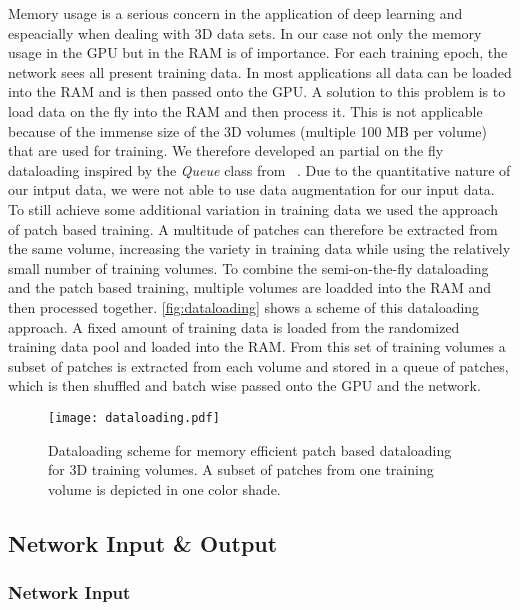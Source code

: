 Memory usage is a serious concern in the application of deep learning and espeacially when dealing with 3D data sets. 
In our case not only the memory usage in the \ac{GPU} but in the \ac{RAM} is of importance. For each training epoch, the network sees all present training data. 
In most applications all data can be loaded into the \acs{RAM} and is then passed onto the \acs{GPU}.
A solution to this problem is to load data on the fly into the RAM and then process it.
This is not applicable because of the immense size of the 3D volumes (multiple 100 MB per volume) that are used for training. 
We therefore developed an partial on the fly dataloading inspired by the \emph{Queue} class from \citeauthor{perez-garcia_torchio_2021}~\cite{perez-garcia_torchio_2021}. 
Due to the quantitative nature of our intput data, we were not able to use data augmentation for our input data. 
To still achieve some additional variation in training data we used the approach of patch based training. 
A multitude of patches can therefore be extracted from the same volume, increasing the variety in training data while using the relatively small number of training volumes. 
To combine the semi-on-the-fly dataloading and the patch based training, multiple volumes are loadded into the RAM and then processed together. 
\autoref{fig:dataloading} shows a scheme of this dataloading approach. 
A fixed amount of training data is loaded from the randomized training data pool and loaded into the RAM. 
From this set of training volumes a subset of patches is extracted from each volume and stored in a queue of patches, which is then shuffled and batch wise passed onto the GPU and the network. 

\begin{figure}
    \centering
    \texttt{[image: dataloading.pdf]}
    \caption{Dataloading scheme for memory efficient patch based dataloading for 3D training volumes. A subset of patches from one training volume is depicted in one color shade.}\label{fig:dataloading}
\end{figure}

\subsection{Network Input \& Output}

\subsubsection{Network Input}

